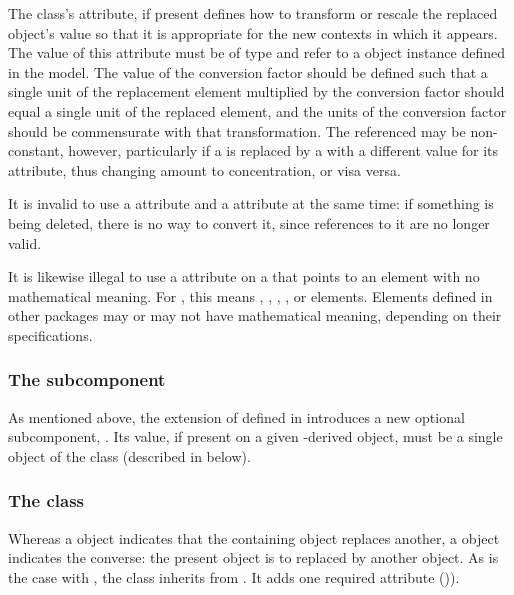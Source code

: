 The \ReplacedElement class's  attribute, if present
defines how to transform or rescale the replaced object's value so that
it is appropriate for the new contexts in which it appears.  The value
of this attribute must be of type  and refer to a
\Parameter object instance defined in the model.  The value of the
conversion factor should be defined such that a
single unit of the replacement element multiplied by the conversion
factor should equal a single unit of the replaced element, and the units
of the conversion factor should be commensurate with that transformation.  
The referenced \Parameter may be non-constant, however, particularly 
if a \Species is replaced by a \Species with a different 
value for its  attribute, thus changing amount
to concentration, or visa versa.

It is invalid to use a 
attribute and a  attribute at the same time:  if something
is being deleted, there is no way to convert it, since references to it are
no longer valid.

It is likewise illegal to use a  attribute on a 
\ReplacedElement that points to an element with no mathematical meaning.  For
\sbmlthreecore, this means \Compartment, \Parameter, 
\Reaction, \Species, or \SpeciesReference elements.
Elements defined in other packages may or may not have mathematical meaning, depending
on their specifications.

\subsubsection{The \fixttspace{} subcomponent}

As mentioned above, the extension of \SBase defined in
 introduces a new optional subcomponent,
.  Its value, if present on a given \SBase-derived
object, must be a single object of the \ReplacedBy class (described in
 below).


\subsubsection{The \ReplacedBy class}
\label{replacedby-class}

Whereas a \ReplacedElement object indicates that the containing object
replaces another, a \ReplacedBy object indicates the converse: the
present object is to replaced by another object.  As is the case with
\ReplacedElement, the \ReplacedBy class inherits from \SBaseRef.  It
adds one required attribute ()).

